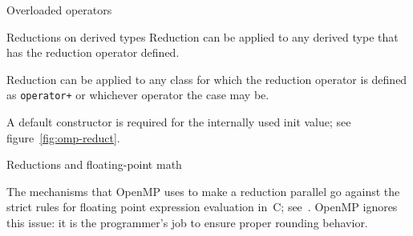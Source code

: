 {Overloaded operators}

\begin{fortrannote}{Reductions on derived types}
  Reduction can be applied to any derived type that has the
  reduction operator defined.
  \begin{multicols}{2}
    \columnbreak
  \end{multicols}
  
\end{fortrannote}

\begin{cppnote}
  Reduction can be applied to any class for which the
  reduction operator is defined as \lstinline{operator+}
  or whichever operator the case may be.
  \begin{multicols}{2}
    \columnbreak
  \end{multicols}
  A default constructor is required for the
  internally used init value;
  see figure~\ref{fig:omp-reduct}.
\end{cppnote}


 {Reductions and floating-point math}

The mechanisms that OpenMP uses to make a reduction parallel go
against the strict rules for floating point expression evaluation in~C;
see~. OpenMP ignores this issue: it is the
programmer's job to ensure proper rounding behavior.


\endinput

\begin{verbatim}
================ #threads = 1 ================
               Sequential: 1.761771e+01; total force: 7.552465e+08
       Full loop Parallel: 3.251586e+00; total force: 7.552465e+08, speedup= 5.42
 Triangular update atomic: 1.787765e+01; total force: 7.552465e+08, speedup= 0.99
         Full loop atomic: 2.001587e+01; total force: 7.552465e+08, speedup= 0.88
================ #threads = 18 ================
               Sequential: 1.764474e+01; total force: 7.426427e+08
       Full loop Parallel: 1.820593e+00; total force: 7.426427e+08, speedup= 9.69
 Triangular update atomic: 2.513533e+00; total force: 7.426427e+08, speedup= 7.02
         Full loop atomic: 1.117391e+00; total force: 7.426427e+08, speedup=15.79
================ #threads = 37 ================
               Sequential: 1.764488e+01; total force: 7.383082e+08
       Full loop Parallel: 4.445617e+00; total force: 7.383082e+08, speedup= 3.97
 Triangular update atomic: 1.560774e+00; total force: 7.383082e+08, speedup=11.31
         Full loop atomic: 5.465267e-01; total force: 7.383082e+08, speedup=32.29
================ #threads = 56 ================
               Sequential: 1.764368e+01; total force: 7.420574e+08
       Full loop Parallel: 8.536602e+00; total force: 7.420574e+08, speedup= 2.07
 Triangular update atomic: 1.221944e+00; total force: 7.420574e+08, speedup=14.44
         Full loop atomic: 3.623484e-01; total force: 7.420574e+08, speedup=48.69
\end{verbatim}


